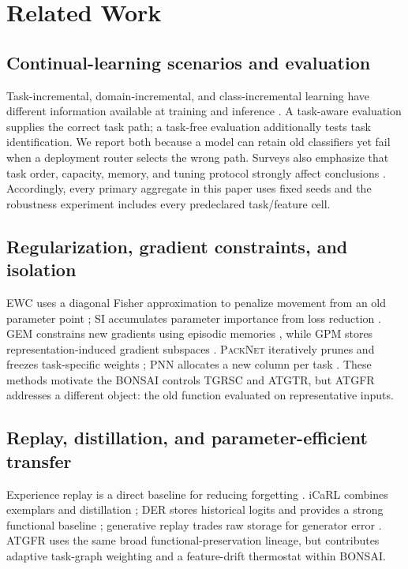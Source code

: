 \documentclass[conference]{IEEEtran}
\newcommand{\ATGFR}{\textsc{ATGFR}}
\newcommand{\TGRSC}{\textsc{TGRSC}}
\newcommand{\ATGTR}{\textsc{ATGTR}}
\newcommand{\BONSAI}{\textsc{BONSAI}}
\newcommand{\EWC}{\textsc{EWC}}
\newcommand{\SI}{\textsc{SI}}
\newcommand{\PNN}{\textsc{PNN}}
\newcommand{\PackNet}{\textsc{PackNet}}
\begin{document}
\section{Related Work}
\label{sec:related}

\subsection{Continual-learning scenarios and evaluation}

Task-incremental, domain-incremental, and class-incremental learning have
different information available at training and inference
\cite{vandeven2019three}. A task-aware evaluation supplies the correct task
path; a task-free evaluation additionally tests task identification. We report
both because a model can retain old classifiers yet fail when a deployment
router selects the wrong path. Surveys also emphasize that task order,
capacity, memory, and tuning protocol strongly affect conclusions
\cite{delange2023survey}. Accordingly, every primary aggregate in this paper
uses fixed seeds and the robustness experiment includes every predeclared
task/feature cell.

\subsection{Regularization, gradient constraints, and isolation}

\EWC{} uses a diagonal Fisher approximation to penalize movement from an old
parameter point \cite{kirkpatrick2017ewc}; \SI{} accumulates parameter
importance from loss reduction \cite{zenke2017si}. GEM constrains new
gradients using episodic memories \cite{lopezpaz2017gem}, while GPM stores
representation-induced gradient subspaces \cite{saha2021gpm}. \PackNet{}
iteratively prunes and freezes task-specific weights
\cite{mallya2018packnet}; \PNN{} allocates a new column per task
\cite{rusu2016progressive}. These methods motivate the \BONSAI{} controls
\TGRSC{} and \ATGTR{}, but \ATGFR{} addresses a different object: the old
function evaluated on representative inputs.

\subsection{Replay, distillation, and parameter-efficient transfer}

Experience replay is a direct baseline for reducing forgetting
\cite{rolnick2019replay}. iCaRL combines exemplars and distillation
\cite{rebuffi2017icarl}; DER stores historical logits and provides a strong
functional baseline \cite{buzzega2020der}; generative replay trades raw
storage for generator error \cite{shin2017generative}. \ATGFR{} uses the
same broad functional-preservation lineage, but contributes adaptive
task-graph weighting and a feature-drift thermostat within \BONSAI{}.
\end{document}
